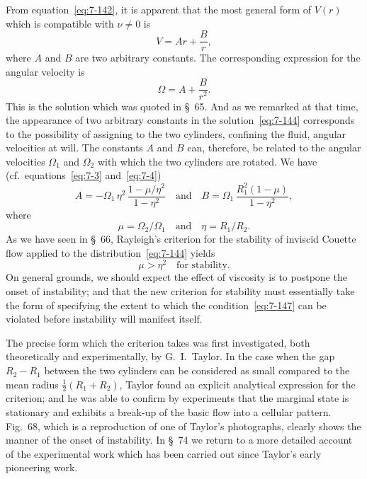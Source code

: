 From equation~\eqref{eq:7-142}, it is apparent that the most general form of $V(r)$
which is compatible with $\nu \neq 0$ is
\begin{equation}
\label{eq:7-143}
V = Ar + \frac{B}{r},
\end{equation}
where $A$ and $B$ are two arbitrary constants.  The corresponding expression for the angular velocity is
\begin{equation}
\label{eq:7-144}
\Omega = A + \frac{B}{r^2}.
\end{equation}
This is the solution which was quoted in \S~65.  And as we remarked at
that time, the appearance of two arbitrary constants in the solution~\eqref{eq:7-144}
corresponds to the possibility of assigning to the two cylinders, confining
the fluid, angular velocities at will.  The constants $A$ and $B$ can, therefore, be related to the angular velocities $\Omega_1$ and $\Omega_2$ with which the two
cylinders are rotated.  We have (cf.\ equations~\eqref{eq:7-3} and~\eqref{eq:7-4})
\begin{equation}
\label{eq:7-145}
A = -\Omega_1\,\eta^2\,\frac{1-\mu/\eta^2}{1-\eta^2}
\quad \text{and} \quad
B = \Omega_1\,\frac{R_1^2(1-\mu)}{1-\eta^2},
\end{equation}
where
\begin{equation}
\label{eq:7-146}
\mu = \Omega_2/\Omega_1 \quad \text{and} \quad \eta = R_1/R_2.
\end{equation}
As we have seen in \S~66, Rayleigh's criterion for the stability of inviscid
Couette flow applied to the distribution~\eqref{eq:7-144} yields
\begin{equation}
\label{eq:7-147}
\mu > \eta^2 \quad \text{for stability.}
\end{equation}
On general grounds, we should expect the effect of viscosity is to
postpone the onset of instability; and that the new criterion for stability
must essentially take the form of specifying the extent to which the
condition~\eqref{eq:7-147} can be violated before instability will manifest itself.

The precise form which the criterion takes was first investigated, both
theoretically and experimentally, by G.~I.~Taylor.  In the case when the
gap $R_2-R_1$ between the two cylinders can be considered as small
compared to the mean radius $\frac{1}{2}(R_1+R_2)$, Taylor found an explicit
analytical expression for the criterion; and he was able to confirm by
experiments that the marginal state is stationary and exhibits a break-up
of the basic flow into a cellular pattern.  Fig.~68, which is a reproduction of one of Taylor's photographs, clearly shows the manner of the
onset of instability.  In \S~74 we return to a more detailed account of the
experimental work which has been carried out since Taylor's early
pioneering work.

